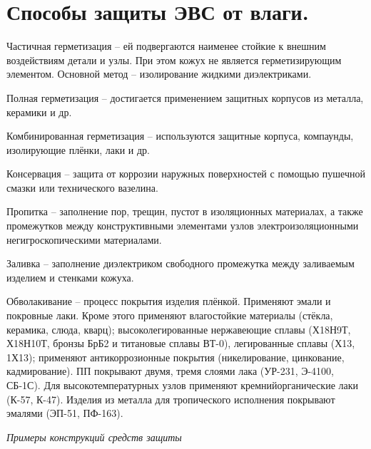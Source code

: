 \documentclass[unicode, 12pt, a4paper, oneside]{article}
\begin{document}
\section{Способы защиты ЭВС от влаги.}

Частичная герметизация – ей подвергаются наименее стойкие к внешним воздействиям детали и узлы. При этом кожух не является герметизирующим элементом. Основной метод – изолирование жидкими диэлектриками.

Полная герметизация – достигается применением защитных корпусов из металла, керамики и др.

Комбинированная герметизация – используются защитные корпуса, компаунды, изолирующие плёнки, лаки и др.

Консервация – защита от коррозии наружных поверхностей с помощью пушечной смазки или технического вазелина.

Пропитка – заполнение пор, трещин, пустот в изоляционных материалах, а также промежутков между конструктивными элементами узлов электроизоляционными негигроскопическими материалами.

Заливка – заполнение диэлектриком свободного промежутка между заливаемым изделием и стенками кожуха.

Обволакивание – процесс покрытия изделия плёнкой. Применяют эмали и покровные лаки. Кроме этого применяют влагостойкие материалы (стёкла, керамика, слюда, кварц); высоколегированные нержавеющие сплавы (Х18Н9Т, Х18Н10Т, бронзы БрБ2 и титановые сплавы ВТ-0), легированные сплавы (Х13, 1Х13); применяют антикоррозионные покрытия (никелирование, цинкование, кадмирование). ПП покрывают двумя, тремя слоями лака (УР-231, Э-4100, СБ-1С). Для высокотемпературных узлов применяют кремнийорганические лаки (К-57, К-47). Изделия из металла для тропического исполнения покрывают эмалями (ЭП-51, ПФ-163).

\textit{Примеры конструкций средств защиты}
\end{document}
